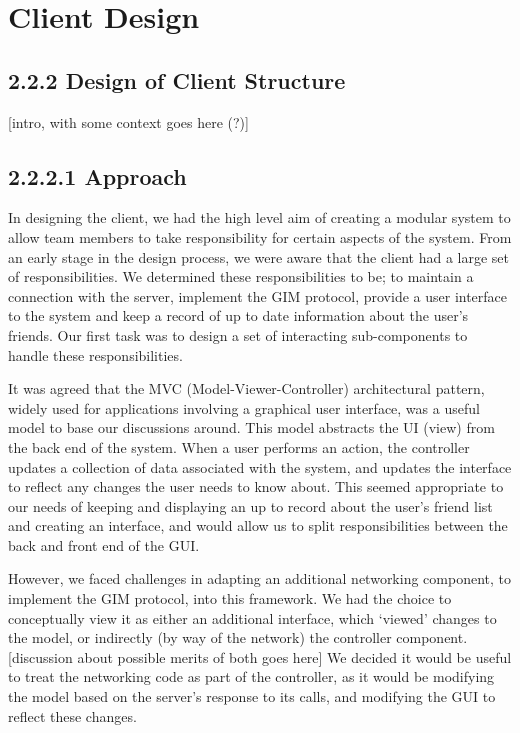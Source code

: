 \section{Client Design}

\subsection{2.2.2 Design of Client Structure}

[intro, with some context goes here (?)]

\subsection{2.2.2.1 Approach}

In designing the client, we had the high level aim of creating a modular system to allow team members to take responsibility for certain aspects of the system. From an early stage in the design process, we were aware that the client had a large set of responsibilities. We determined these responsibilities to be;  to maintain a connection with the server, implement the GIM protocol, provide a user interface to the system and keep a record of up to date information about the user’s friends. Our first task was to design a set of interacting sub-components to handle these responsibilities.

It was agreed that the MVC (Model-Viewer-Controller) architectural pattern, widely used for applications involving a graphical user interface, was a useful model to base our discussions around. This model abstracts the UI (view) from the back end of the system. When a user performs an action, the controller updates a collection of data associated with the system, and updates the interface to reflect any changes the user needs to know about. This seemed appropriate to our needs of keeping and displaying an up to record about the user’s friend list and creating an interface, and would allow us to split responsibilities between the back and front end of the GUI. 

However, we faced challenges in adapting an additional networking component, to implement the GIM protocol, into this framework. We had the choice to conceptually view it as either an additional interface, which ‘viewed’ changes to the model, or indirectly (by way of the network) the controller component. [discussion about possible merits of both goes here] We decided it would be useful to treat the networking code as part of the controller, as it would be modifying the model based on the server’s response to its calls, and modifying the GUI to reflect these changes.
	
